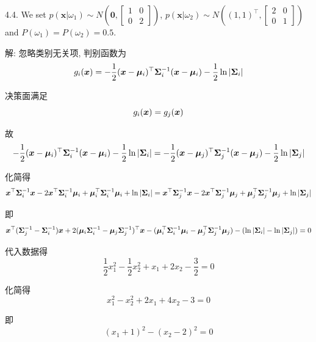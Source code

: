 \documentclass{article}
\begin{document}
4.4. We set $p(\bm{x}|\omega_1)\sim N\left(\bm{0},\begin{bmatrix} 1 & 0 \\ 0 & 2 \end{bmatrix}\right)$, $p(\bm{x}|\omega_2)\sim N\left((1,1)^{\top},\begin{bmatrix} 2 & 0 \\ 0 & 1 \end{bmatrix}\right)$ and $P(\omega_1)=P(\omega_2)=0.5$.

解: 忽略类别无关项, 判别函数为
\begin{equation}
  g_i(\bm{x})=-\frac{1}{2}(\bm{x}-\bm{\mu}_i)^{\top}\bm{\Sigma}_i^{-1}(\bm{x}-\bm{\mu}_i)-\frac{1}{2}\ln|\bm{\Sigma}_i|
\end{equation}

决策面满足
\begin{equation}
  g_i(\bm{x})=g_j(\bm{x})
\end{equation}

故
\begin{equation}
  -\frac{1}{2}(\bm{x}-\bm{\mu}_i)^{\top}\bm{\Sigma}_i^{-1}(\bm{x}-\bm{\mu}_i)-\frac{1}{2}\ln|\bm{\Sigma}_i|=-\frac{1}{2}(\bm{x}-\bm{\mu}_j)^{\top}\bm{\Sigma}_j^{-1}(\bm{x}-\bm{\mu}_j)-\frac{1}{2}\ln|\bm{\Sigma}_j|
\end{equation}

化简得
\begin{equation}
  \bm{x}^{\top}\bm{\Sigma}_i^{-1}\bm{x}-2\bm{x}^{\top}\bm{\Sigma}_i^{-1}\bm{\mu}_i+\bm{\mu}_i^{\top}\bm{\Sigma}_i^{-1}\bm{\mu}_i+\ln|\bm{\Sigma}_i|
  =\bm{x}^{\top}\bm{\Sigma}_j^{-1}\bm{x}-2\bm{x}^{\top}\bm{\Sigma}_j^{-1}\bm{\mu}_j+\bm{\mu}_j^{\top}\bm{\Sigma}_j^{-1}\bm{\mu}_j+\ln|\bm{\Sigma}_j|
\end{equation}

即
\begin{equation}
  \bm{x}^{\top}(\bm{\Sigma}_j^{-1}-\bm{\Sigma}_i^{-1})\bm{x}+2(\bm{\mu}_i\bm{\Sigma}_i^{-1}-\bm{\mu}_j\bm{\Sigma}_j^{-1})^{\top}\bm{x}-(\bm{\mu}_i^{\top}\bm{\Sigma}_i^{-1}\bm{\mu}_i-\bm{\mu}_j^{\top}\bm{\Sigma}_j^{-1}\bm{\mu}_j)-(\ln|\bm{\Sigma}_i|-\ln|\bm{\Sigma}_j|)=0
\end{equation}

代入数据得
\begin{equation}
  \frac{1}{2}x_1^2-\frac{1}{2}x_2^2+x_1+2x_2-\frac{3}{2}=0
\end{equation}

化简得
\begin{equation}
  x_1^2-x_2^2+2x_1+4x_2-3=0
\end{equation}

即
\begin{equation}
  (x_1+1)^2-(x_2-2)^2=0
\end{equation}
\end{document}
